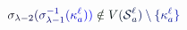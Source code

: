 \documentclass[12pt]{article}
\begin{document}
\makeatletter
\renewcommand*{\@textcolor}[3]{%
  \protect\leavevmode
  \begingroup
    \color#1{#2}#3%
  \endgroup
}
\makeatother
\begin{displaymath}
\mathcolor[RGB]{0,0,15}{\sigma} _ { \mathcolor[RGB]{0,0,30}{\lambda} \mathcolor[RGB]{0,0,45}{-} \mathcolor[RGB]{0,0,60}{2} } \mathcolor[RGB]{0,0,75}{(} \mathcolor[RGB]{0,0,90}{\sigma} _ { \mathcolor[RGB]{0,0,105}{\lambda} \mathcolor[RGB]{0,0,120}{-} \mathcolor[RGB]{0,0,135}{1} } ^ { \mathcolor[RGB]{0,0,150}{-} \mathcolor[RGB]{0,0,165}{1} } \mathcolor[RGB]{0,0,180}{(} \mathcolor[RGB]{0,0,195}{\kappa} _ { \mathcolor[RGB]{0,0,210}{a} } ^ { \mathcolor[RGB]{0,0,225}{\ell} } \mathcolor[RGB]{0,0,240}{)} \mathcolor[RGB]{0,0,255}{)} \mathcolor[RGB]{0,15,0}{\notin} \mathcolor[RGB]{0,15,15}{V} \mathcolor[RGB]{0,15,30}{(} \mathcal { \mathcolor[RGB]{0,15,45}{S} } _ { \mathcolor[RGB]{0,15,60}{a} } ^ { \mathcolor[RGB]{0,15,75}{\ell} } \mathcolor[RGB]{0,15,90}{)} \mathcolor[RGB]{0,15,105}{\setminus} \mathcolor[RGB]{0,15,120}{\{} \mathcolor[RGB]{0,15,135}{\kappa} _ { \mathcolor[RGB]{0,15,150}{a} } ^ { \mathcolor[RGB]{0,15,165}{\ell} } \mathcolor[RGB]{0,15,180}{\}}
\end{displaymath}
\end{document}
